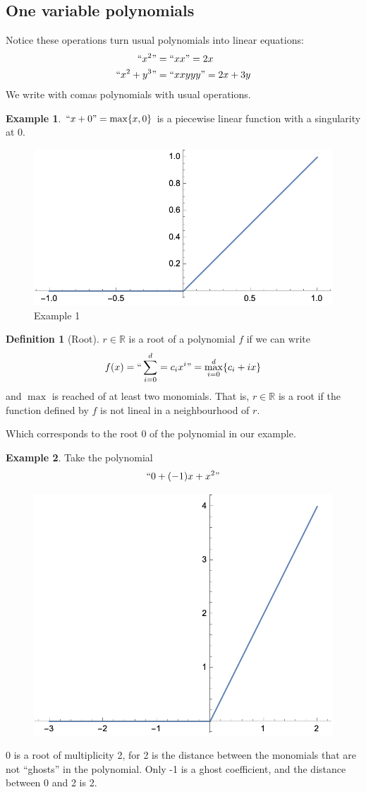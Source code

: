 \documentclass{article}
\theoremstyle{definition}
\newtheorem*{defn}{Definition}
\newtheorem{ex}{Example}
\newcommand{\R}{\mathbb{R}}
\begin{document}
\subsection{One variable polynomials}
Notice these operations turn usual polynomials into linear equations:
\begin{align*}
	``{x^2}"&=``xx"=2x\\
		``x^2+y^3"&=``xxyyy"=2x+3y
\end{align*}
We write with comas polynomials with usual operations.
\begin{ex}
	$``x+0"=\max\{x,0\}$ is a piecewise linear function with a singularity at 0.
	\begin{figure}[H]
		\centering
		\includegraphics[width=0.7\linewidth]{1}
		\caption*{Example 1}
		\label{fig:1}
	\end{figure}
	
\end{ex}
\begin{defn}[Root]
	$r\in\R$ is a root of a polynomial $f$ if we can write \begin{align*}f(x)=``\sum_{i=0}^d=c_ix^i"=\max_{i=0}^d\{c_i+ix\}\end{align*}
	and $\max$ is reached of at least two monomials.
	That is, $r\in\R$ is a root if the function defined by $f$ is not lineal in a neighbourhood of $r$.
\end{defn}
Which corresponds to the root 0 of the polynomial in our example.
\begin{ex} Take the polynomial
	$$``0+(-1)x+x^2"$$
	\begin{figure}[H]
		\centering
		\includegraphics[width=0.5\linewidth]{2}
		\caption{}
		\label{fig:3}
	\end{figure}
	
	0 is a root of multiplicity 2, for 2 is the distance between the monomials that are not ``ghosts'' in the polynomial. Only -1 is a ghost coefficient, and the distance between 0 and 2 is 2.
\end{ex}
\end{document}
